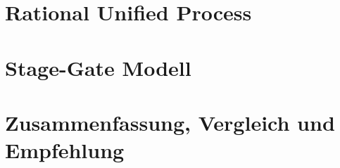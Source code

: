 \documentclass[a4paper, twopage]{scrreprt}
\begin{document}
\chapter{Rational Unified Process}



\chapter{Stage-Gate Modell}



\chapter{Zusammenfassung, Vergleich und Empfehlung}
\label{ch:zusammenfassung}



\nocite{*}
\printbibliography

\listoffigures
\end{document}
